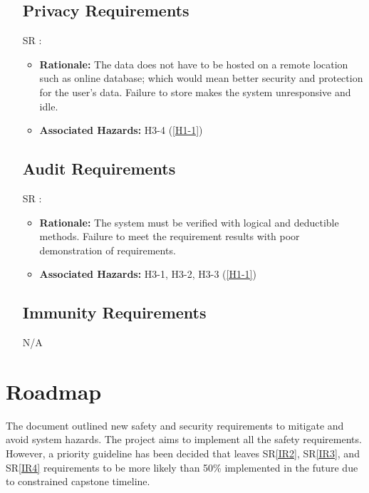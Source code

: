 \documentclass{article}
\newcounter{Sreqnum} %
\begin{document}
\begin{itemize}
\subsection{Privacy Requirements}
\item[SR\refstepcounter{Sreqnum}\theSreqnum
\label{PR1}:] 
\begin{itemize}
    \item \textbf{Rationale:} The data does not have to be hosted on a remote location such as online database; which would mean better security and protection for the user's data. Failure to store makes the system unresponsive and idle. 
    \item \textbf{Associated Hazards:} H3-4 (\ref{H1-1})
\end{itemize}

\subsection{Audit Requirements}
\item[SR\refstepcounter{Sreqnum}\theSreqnum
\label{ADR1}:] 
\begin{itemize}
    \item \textbf{Rationale:} The system must be verified with logical and deductible methods. Failure to meet the requirement results with poor demonstration of requirements.
    \item \textbf{Associated Hazards:} H3-1, H3-2, H3-3 (\ref{H1-1})
\end{itemize}

\subsection{Immunity Requirements}
N/A

\end{itemize}

\section{Roadmap}

The document outlined new safety and security requirements to mitigate and avoid system hazards. The project aims to implement all the safety requirements. However, a priority guideline has been decided that leaves SR\ref{IR2}, SR\ref{IR3}, and SR\ref{IR4} requirements to be more likely than 50\% implemented in the future due to constrained capstone timeline. 



\end{document}
